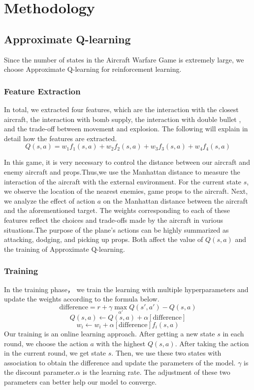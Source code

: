 \documentclass{article}
\begin{document}
\section{ Methodology}
    \subsection{Approximate Q-learning}
        Since the number of states in the Aircraft Warfare Game is extremely large, we choose Approximate Q-learning for reinforcement learning. 
    \subsubsection{Feature Extraction}
        In total, we extracted four features, which are the interaction with the closest aircraft, the interaction with bomb supply, the interaction with double bullet , and the trade-off between movement and explosion. The following will explain in detail how the features are extracted.
        \[Q(s,a) = w_1f_1(s,a)+w_2f_2(s,a)+w_3f_3(s,a)+w_4f_4(s,a)\]
    
        In this game, it is very necessary to control the distance between our aircraft and enemy aircraft and props.Thus,we use the Manhattan distance to measure the interaction of the aircraft with the external environment. For the current state $s$, we observe the location of the nearest enemies, game props to the aircraft. Next, we analyze the effect of action $a$ on the Manhattan distance between the aircraft and the aforementioned target. The weights corresponding to each of these features reflect the choices and trade-offs made by the aircraft in various situations.The purpose of the plane's actions can be highly summarized as attacking, dodging, and picking up props. Both affect the value of $Q(s,a)$ and the training of Approximate Q-learning.
    \subsubsection{Training}
        In the training phase， we train the learning with multiple hyperparameters and update the weights according to the formula below.
        \[ \mathrm{difference} = r+\gamma \mathop{\mathrm{max}}_{\alpha'}Q(s',a')-Q(s,a)\]
        \[ Q(s,a) \xleftarrow{} Q(s,a) +\alpha[\mathrm{difference}]\]
        \[w_i \xleftarrow{} w_i+\alpha[\mathrm{difference}] f_i(s,a)\]
        Our training is an online learning approach. After getting a new state $s$ in each round, we choose the action $a$ with the highest $Q(s,a)$. After taking the action in the current round, we get state $s$. Then, we use these two states with association to obtain the difference and update the parameters of the model. $\gamma$ is the discount parameter.$\alpha$ is the learning rate. The adjustment of these two parameters can better help our model to converge.
        
\end{document}

